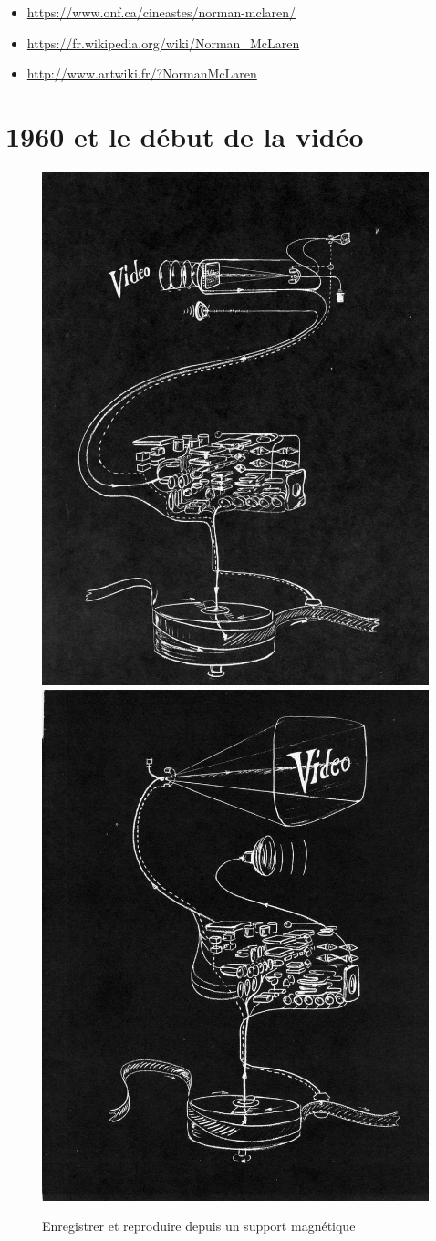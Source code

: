 \documentclass[
  french,
]{book}
\providecommand{\tightlist}{%
  \setlength{\itemsep}{0pt}\setlength{\parskip}{0pt}}
\begin{document}
\begin{itemize}
\tightlist
\item
  \url{https://www.onf.ca/cineastes/norman-mclaren/}
\item
  \url{https://fr.wikipedia.org/wiki/Norman_McLaren}
\item
  \url{http://www.artwiki.fr/?NormanMcLaren}
\end{itemize}

\hypertarget{et-le-duxe9but-de-la-viduxe9o}{%
\section{1960 et le début de la vidéo}\label{et-le-duxe9but-de-la-viduxe9o}}

\begin{figure}

{\centering \includegraphics[width=0.49\linewidth]{medias/corpus/1960/Charles_Bensinger_video_guide_2} \includegraphics[width=0.49\linewidth]{medias/corpus/1960/Charles_Bensinger_video_guide_3} 

}

\caption{Enregistrer et reproduire depuis un support magnétique}\label{fig:unnamed-chunk-2}
\end{figure}
\end{document}
